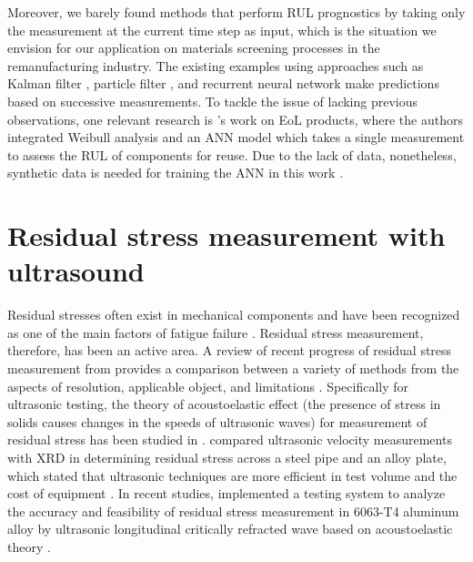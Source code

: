  Moreover, we barely found methods that perform RUL prognostics by taking only the measurement at the current time step as input, which is the situation we envision for our application on materials screening processes in the remanufacturing industry. The existing examples using approaches such as Kalman filter \cite{rul-statespace-fatigue-RAY1996}, particle filter \cite{rul-statespace-fatigue-8819426}, and recurrent neural network \cite{rul-rnn-turbo-WU2020241} make predictions based on successive measurements. To tackle the issue of lacking previous observations, one relevant research is 's work on EoL products, where the authors integrated Weibull analysis and an ANN model which takes a single measurement to assess the RUL of components for reuse. Due to the lack of data, nonetheless, synthetic data is needed for training the ANN in this work \cite{rul-nn-eol-MAZHAR20071184}.


\section{Residual stress measurement with ultrasound}
Residual stresses often exist in mechanical components and have been recognized as one of the main factors of fatigue failure \cite{rs-fatigue-WEBSTER2001375}. Residual stress measurement, therefore, has been an active area. A review of recent progress of residual stress measurement from  provides a comparison between a variety of methods from the aspects of resolution, applicable object, and limitations \cite{nde-rs-review-GUO202154}. Specifically for ultrasonic testing, the theory of acoustoelastic effect (the presence of stress in solids causes changes in the speeds of ultrasonic waves) for measurement of residual stress has been studied in \cite{nde-lu-rs-Man1987}.  compared ultrasonic velocity measurements with XRD in determining residual stress across a steel pipe and an alloy plate, which stated that ultrasonic techniques are more efficient in test volume and the cost of equipment \cite{nde-lu-rs-TANALA199583}. In recent studies,  implemented a testing system to analyze the accuracy and feasibility of residual stress measurement in 6063-T4 aluminum alloy by ultrasonic longitudinal critically refracted wave based on acoustoelastic theory \cite{nde-lu-rs-LIU2018178}.
